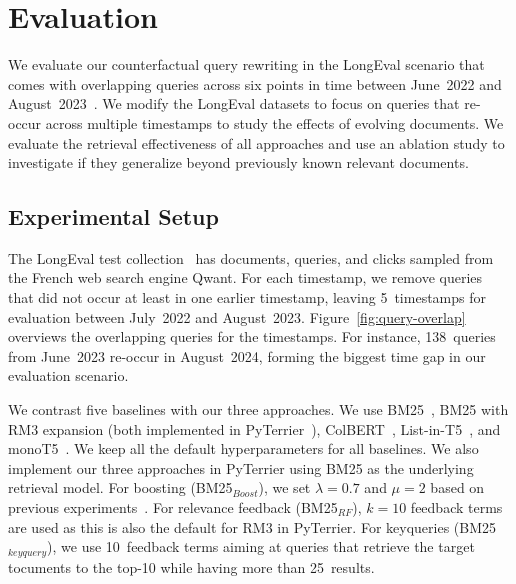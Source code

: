 \section{Evaluation}

\enlargethispage*{2\baselineskip}
We evaluate our counterfactual query rewriting in the LongEval scenario that comes with overlapping queries across six points in time between June~2022 and August~2023~\cite{alkhalifa:2023,alkhalifa:2024,galuscakova:2023}. We modify the LongEval datasets to focus on queries that re-occur across multiple timestamps to study the effects of evolving documents. We evaluate the retrieval effectiveness of all approaches and use an ablation study to investigate if they generalize beyond previously known relevant documents.

\subsection{Experimental Setup}
The LongEval test collection~\cite{galuscakova:2023} has documents, queries, and clicks sampled from the French web search engine Qwant. For each timestamp, we remove queries that did not occur at least in one earlier timestamp, leaving 5~timestamps for evaluation between July~2022 and August~2023. %
Figure~\ref{fig:query-overlap} overviews the overlapping queries for the timestamps. For instance, 138~queries from June~2023 re-occur in August~2024, forming the biggest time gap in our evaluation scenario.

We contrast five baselines with our three approaches. We use BM25~\cite{robertson:1994}, BM25 with RM3 expansion (both implemented in PyTerrier~\cite{macdonald:2020}), ColBERT~\cite{khattab:2020}, List-in-T5~\cite{tamber:2023}, and monoT5~\cite{nogueira:2020}. We keep all the default hyperparameters for all baselines. We also implement our three approaches in PyTerrier using BM25 as the underlying retrieval model. For boosting (BM25$_{Boost}$), we set $\lambda=0.7$ and $\mu=2$ based on previous experiments~\cite{keller:2024b}. For relevance feedback (BM25$_{RF}$), $k=10$ feedback terms are used as this is also the default for RM3 in PyTerrier. For keyqueries (BM25$_{keyquery}$), we use 10~feedback terms aiming at queries that retrieve the target tocuments to the top-10 while having more than 25~results.



